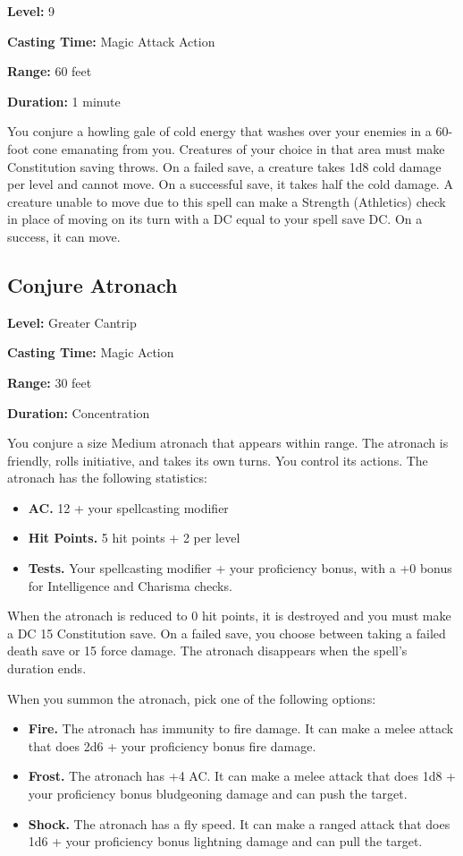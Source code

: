 \documentclass[12pt,letterpaper,twocolumn,openany,nodeprecatedcode,bg=none]{dndbook}
\providecommand{\tightlist}{%
  \setlength{\itemsep}{0pt}\setlength{\parskip}{0pt}}
\begin{document}
\textbf{Level:} 9

\textbf{Casting Time:} Magic Attack Action

\textbf{Range:} 60 feet

\textbf{Duration:} 1 minute

You conjure a howling gale of cold energy that washes over your enemies
in a 60-foot cone emanating from you. Creatures of your choice in that
area must make Constitution saving throws. On a failed save, a creature
takes 1d8 cold damage per level and cannot move. On a successful save,
it takes half the cold damage. A creature unable to move due to this
spell can make a Strength (Athletics) check in place of moving on its
turn with a DC equal to your spell save DC. On a success, it can move.

\subsection{Conjure Atronach}\label{conjure-atronach}

\textbf{Level:} Greater Cantrip

\textbf{Casting Time:} Magic Action

\textbf{Range:} 30 feet

\textbf{Duration:} Concentration

You conjure a size Medium atronach that appears within range. The
atronach is friendly, rolls initiative, and takes its own turns. You
control its actions. The atronach has the following statistics:

\begin{itemize}
\tightlist
\item
  \textbf{AC.} 12 + your spellcasting modifier
\item
  \textbf{Hit Points.} 5 hit points + 2 per level
\item
  \textbf{Tests.} Your spellcasting modifier + your proficiency bonus,
  with a +0 bonus for Intelligence and Charisma checks.
\end{itemize}

When the atronach is reduced to 0 hit points, it is destroyed and you
must make a DC 15 Constitution save. On a failed save, you choose
between taking a failed death save or 15 force damage. The atronach
disappears when the spell's duration ends.

When you summon the atronach, pick one of the following options:

\begin{itemize}
\tightlist
\item
  \textbf{Fire.} The atronach has immunity to fire damage. It can make a
  melee attack that does 2d6 + your proficiency bonus fire damage.
\item
  \textbf{Frost.} The atronach has +4 AC. It can make a melee attack
  that does 1d8 + your proficiency bonus bludgeoning damage and can push
  the target.
\item
  \textbf{Shock.} The atronach has a fly speed. It can make a ranged
  attack that does 1d6 + your proficiency bonus lightning damage and can
  pull the target.
\end{itemize}
\end{document}
